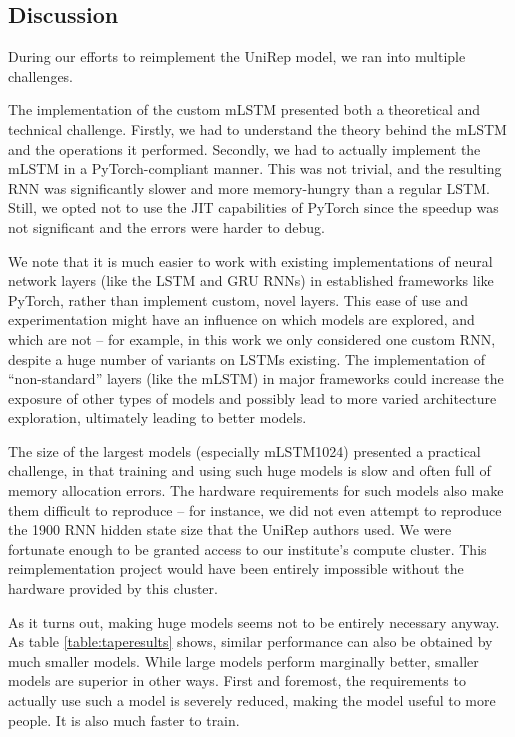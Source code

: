 \documentclass[a4paper,12pt]{article}
\begin{document}
\subsection{Discussion}
During our efforts to reimplement the UniRep model, we ran into multiple challenges.

The implementation of the custom mLSTM presented both a theoretical and technical challenge. Firstly, we had to understand the theory behind the mLSTM and the operations it performed. Secondly, we had to actually implement the mLSTM in a PyTorch-compliant manner. This was not trivial, and the resulting RNN was significantly slower and more memory-hungry than a regular LSTM. Still, we opted not to use the JIT capabilities of PyTorch since the speedup was not significant and the errors were harder to debug.

We note that it is much easier to work with existing implementations of neural network layers (like the LSTM and GRU RNNs) in established frameworks like PyTorch, rather than implement custom, novel layers. This ease of use and experimentation might have an influence on which models are explored, and which are not -- for example, in this work we only considered one custom RNN, despite a huge number of variants on LSTMs existing. The implementation of ``non-standard'' layers (like the mLSTM) in major frameworks could increase the exposure of other types of models and possibly lead to more varied architecture exploration, ultimately leading to better models.

The size of the largest models (especially mLSTM1024) presented a practical challenge, in that training and using such huge models is slow and often full of memory allocation errors. The hardware requirements for such models also make them difficult to reproduce -- for instance, we did not even attempt to reproduce the 1900 RNN hidden state size that the UniRep authors used. We were fortunate enough to be granted access to our institute's compute cluster. This reimplementation project would have been entirely impossible without the hardware provided by this cluster.

As it turns out, making huge models seems not to be entirely necessary anyway. As table \ref{table:taperesults} shows, similar performance can also be obtained by much smaller models. While large models perform marginally better, smaller models are superior in other ways. First and foremost, the requirements to actually use such a model is severely reduced, making the model useful to more people. It is also much faster to train.
\end{document}
